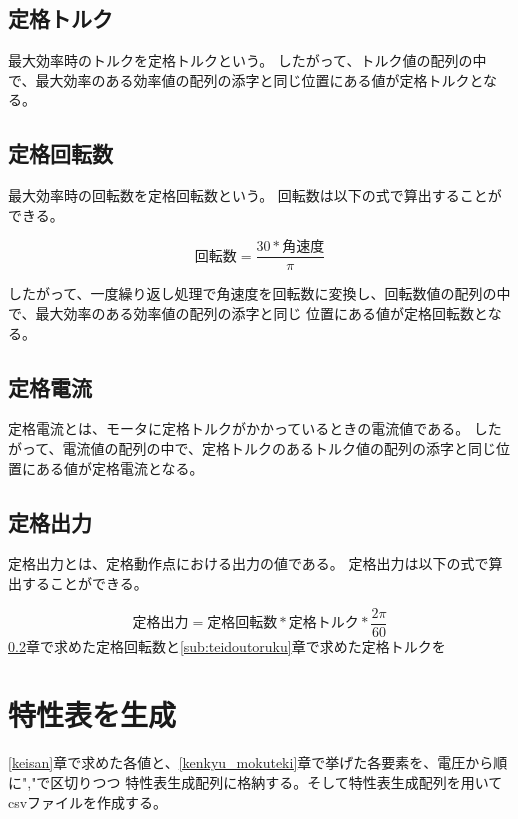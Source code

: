 
\subsection{定格トルク}\label{sub:teikakutoruku}
最大効率時のトルクを定格トルクという。
したがって、トルク値の配列の中で、最大効率のある効率値の配列の添字と同じ位置にある値が定格トルクとなる。



\subsection{定格回転数}\label{sub:teikakukaiten}
最大効率時の回転数を定格回転数という。
回転数は以下の式で算出することができる。

\[
    \mbox{回転数} = \frac{30 * \mbox{角速度}}{\pi}   
\]

したがって、一度繰り返し処理で角速度を回転数に変換し、回転数値の配列の中で、最大効率のある効率値の配列の添字と同じ
位置にある値が定格回転数となる。


\subsection{定格電流}\label{sub:teikakuden}
定格電流とは、モータに定格トルクがかかっているときの電流値である。
したがって、電流値の配列の中で、定格トルクのあるトルク値の配列の添字と同じ位置にある値が定格電流となる。


\subsection{定格出力}\label{sub:teikakusyutu}
定格出力とは、定格動作点における出力の値である。
定格出力は以下の式で算出することができる。

\[
    \mbox{定格出力} = \mbox{定格回転数} * \mbox{定格トルク} *  \frac{2\pi}{60}
\]
\ref{sub:teikakukaiten}章で求めた定格回転数と\ref{sub:teidoutoruku}章で求めた定格トルクを

\section{特性表を生成}\label{seisei_hyou}
\ref{keisan}章で求めた各値と、\ref{kenkyu_mokuteki}章で挙げた各要素を、電圧から順に","で区切りつつ
特性表生成配列に格納する。そして特性表生成配列を用いてcsvファイルを作成する。

